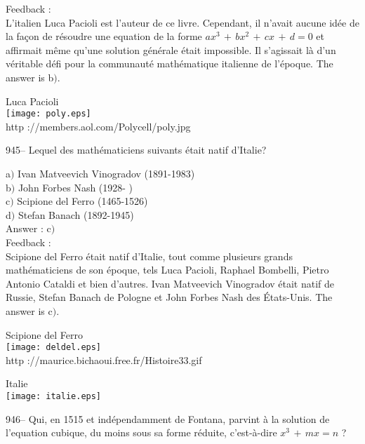 ﻿\documentclass[letterpaper, 12pt]{article}
\begin{document}
Feedback : \\
L'italien Luca Pacioli est l'auteur de ce livre. Cependant, il
n'avait aucune id\'ee de la fa\c con de r\'esoudre une equation de
la forme $ax^3\,+\,bx^2\,+\,cx\,+\,d=0$ et affirmait m\^eme qu'une
solution g\'en\'erale \'etait impossible. Il s'agissait l\`a d'un
v\'eritable d\'efi pour la communaut\'e math\'ematique italienne de
l'\'epoque. The answer is b$)$.\\

        \begin{center}
        Luca Pacioli\\
    \texttt{[image: poly.eps]}\\
        {\footnotesize http ://members.aol.com/Polycell/poly.jpg}
    \end{center}

945-- Lequel des math\'ematiciens suivants \'etait natif d'Italie?

a$)$ Ivan Matveevich Vinogradov (1891-1983)\\
b$)$ John Forbes Nash (1928- ) \\
c$)$ Scipione del Ferro (1465-1526) \\
d$)$ Stefan Banach (1892-1945) \\

Answer : c$)$\\

Feedback :\\
Scipione del Ferro \'etait natif d'Italie, tout comme plusieurs
grands math\'ematiciens de son \'epoque, tels Luca Pacioli, Raphael
Bombelli, Pietro Antonio Cataldi et bien d'autres. Ivan Matveevich
Vinogradov
\'etait natif de Russie, Stefan Banach de Pologne et John Forbes Nash des
\'Etats-Unis. The answer is c$)$.\\

        \begin{center}
        Scipione del Ferro\\
    \texttt{[image: deldel.eps]}\\
        {\footnotesize http ://maurice.bichaoui.free.fr/Histoire33.gif}
    \end{center}

        \begin{center}
        Italie\\
    \texttt{[image: italie.eps]}\\
    \end{center}

946-- Qui, en 1515 et ind\'ependamment de Fontana, parvint \`a la
solution de l'equation cubique, du moins sous sa forme r\'eduite,
c'est-\`a-dire $x^3\,+\,mx=n$ ?
\end{document}
